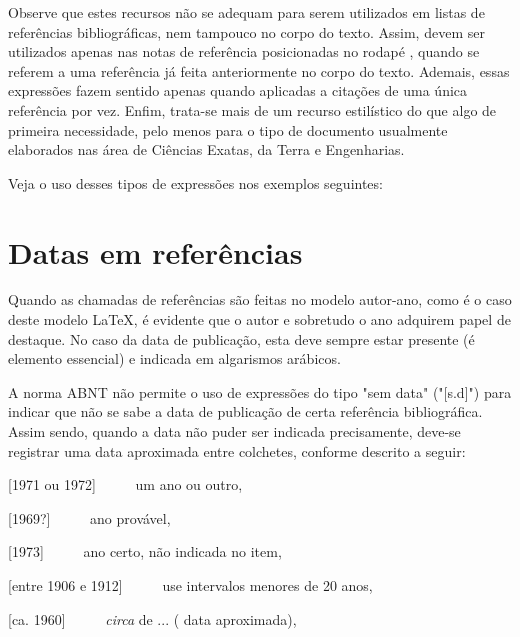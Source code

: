 \begin{apendicesenv}
Observe que estes recursos não se adequam para serem utilizados em listas de referências bibliográficas, nem tampouco no corpo do texto. Assim, devem ser utilizados apenas nas notas de referência posicionadas no rodapé \cite[p.~6]{abnTeX22014c}, quando se referem a uma referência já feita anteriormente no corpo do texto. Ademais, essas expressões fazem sentido apenas quando aplicadas a citações de uma única referência por vez. Enfim, trata-se mais de um recurso estilístico do que algo de primeira necessidade, pelo menos para o tipo de documento usualmente elaborados nas área de Ciências Exatas, da Terra e Engenharias.

Veja o uso desses tipos de expressões nos exemplos seguintes:










\section{Datas em referências}
\label{sec:datasBib}


Quando as chamadas de referências são feitas no modelo autor-ano, como é o caso deste modelo \LaTeX{}, é evidente que o autor e sobretudo o ano adquirem papel de destaque. No caso da data de publicação, esta deve sempre estar presente (é elemento essencial) e indicada em algarismos arábicos.

A norma ABNT não permite o uso de expressões do tipo "sem data"{} ("[s.d]") para indicar que não se sabe a data de publicação de certa referência bibliográfica. Assim sendo, quando a data não puder ser indicada precisamente, deve-se registrar uma data aproximada entre colchetes, conforme descrito a seguir:


[1971 ou 1972] \ \ \ \ \ um ano ou outro,

[1969?] \ \ \ \ \ ano provável,

[1973] \ \ \ \ \ ano certo, não indicada no item,

[entre 1906 e 1912] \ \ \ \ \ use intervalos menores de 20 anos,

[ca. 1960] \ \ \ \ \ \textit{circa} de ... ( data aproximada),


\end{apendicesenv}
